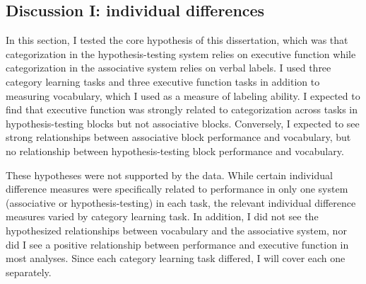 \documentclass[../dissertation.tex]{subfiles}
\begin{document}
\subsection{Discussion I: individual differences}

	In this section, I tested the core hypothesis of this dissertation, which was that categorization in the hypothesis-testing system relies on executive function while categorization in the associative system relies on verbal labels. I used three category learning tasks and three executive function tasks in addition to measuring vocabulary, which I used as a measure of labeling ability. I expected to find that executive function was strongly related to categorization across tasks in hypothesis-testing blocks but not associative blocks. Conversely, I expected to see strong relationships between associative block performance and vocabulary, but no relationship between hypothesis-testing block performance and vocabulary. \par 
	These hypotheses were not supported by the data. While certain individual difference measures were specifically related to performance in only one system (associative or hypothesis-testing) in each task, the relevant individual difference measures varied by category learning task. In addition, I did not see the hypothesized relationships between vocabulary and the associative system, nor did I see a positive relationship between performance and executive function in most analyses. Since each category learning task differed, I will cover each one separately. \par
	
\end{document}
